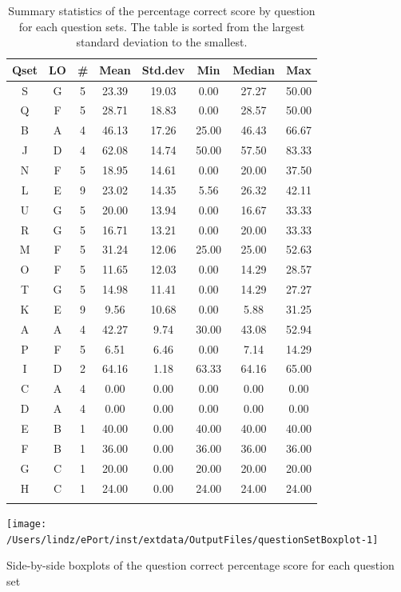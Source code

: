 \documentclass[12pt,english,nohyper]{tufte-handout}\usepackage[]{graphicx}\usepackage[]{color}
\newenvironment{knitrout}{}{} %
\begin{document}
\begin{longtable}{cc|ccc|ccc}
  \hline
Qset & LO & \# & Mean & Std.dev & Min & Median & Max \\ 
  \hline
S & G &   5 & 23.39 & 19.03 & 0.00 & 27.27 & 50.00 \\ 
  Q & F &   5 & 28.71 & 18.83 & 0.00 & 28.57 & 50.00 \\ 
  B & A &   4 & 46.13 & 17.26 & 25.00 & 46.43 & 66.67 \\ 
  J & D &   4 & 62.08 & 14.74 & 50.00 & 57.50 & 83.33 \\ 
  N & F &   5 & 18.95 & 14.61 & 0.00 & 20.00 & 37.50 \\ 
  L & E &   9 & 23.02 & 14.35 & 5.56 & 26.32 & 42.11 \\ 
  U & G &   5 & 20.00 & 13.94 & 0.00 & 16.67 & 33.33 \\ 
  R & G &   5 & 16.71 & 13.21 & 0.00 & 20.00 & 33.33 \\ 
  M & F &   5 & 31.24 & 12.06 & 25.00 & 25.00 & 52.63 \\ 
  O & F &   5 & 11.65 & 12.03 & 0.00 & 14.29 & 28.57 \\ 
  T & G &   5 & 14.98 & 11.41 & 0.00 & 14.29 & 27.27 \\ 
  K & E &   9 & 9.56 & 10.68 & 0.00 & 5.88 & 31.25 \\ 
  A & A &   4 & 42.27 & 9.74 & 30.00 & 43.08 & 52.94 \\ 
  P & F &   5 & 6.51 & 6.46 & 0.00 & 7.14 & 14.29 \\ 
  I & D &   2 & 64.16 & 1.18 & 63.33 & 64.16 & 65.00 \\ 
  C & A &   4 & 0.00 & 0.00 & 0.00 & 0.00 & 0.00 \\ 
  D & A &   4 & 0.00 & 0.00 & 0.00 & 0.00 & 0.00 \\ 
  E & B &   1 & 40.00 & 0.00 & 40.00 & 40.00 & 40.00 \\ 
  F & B &   1 & 36.00 & 0.00 & 36.00 & 36.00 & 36.00 \\ 
  G & C &   1 & 20.00 & 0.00 & 20.00 & 20.00 & 20.00 \\ 
  H & C &   1 & 24.00 & 0.00 & 24.00 & 24.00 & 24.00 \\ 
   \hline
\hline
\caption{Summary statistics of the percentage correct score by question for each question sets. The table is sorted from the largest standard deviation to the smallest.} 
\label{tab:QuestionSet_summary}
\end{longtable}


\begin{knitrout}
\color{fgcolor}\begin{marginfigure}

{\centering \texttt{[image: /Users/lindz/ePort/inst/extdata/OutputFiles/questionSetBoxplot-1]} 

}

\caption[Side-by-side boxplots of the question correct percentage score for each question set]{Side-by-side boxplots of the question correct percentage score for each question set}\label{fig:questionSetBoxplot}
\end{marginfigure}


\end{knitrout}
\end{document}
